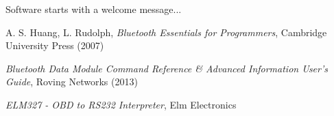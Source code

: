 \documentclass[twoside]{article}
\begin{document}
\begin{multicols}{2}
Software starts with a welcome message...



\begin{thebibliography}{99} %

\bibitem{} A. S. Huang, L. Rudolph,
  \emph{Bluetooth Essentials for Programmers},
  Cambridge University Press (2007)

\bibitem{}
  \emph{Bluetooth Data Module Command Reference \& Advanced Information User's Guide},
  Roving Networks (2013)
  
\bibitem{}
  \emph{ELM327 - OBD to RS232 Interpreter},
  Elm Electronics
 
\end{thebibliography}


\end{multicols}
\end{document}
